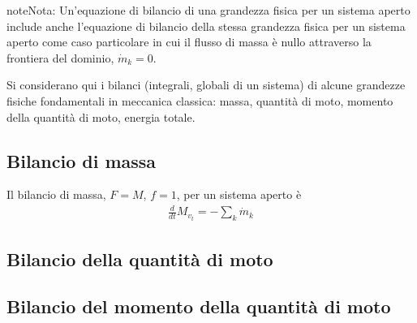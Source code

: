 \documentclass[letterpaper,10pt,italian]{jupyterBook}
\begin{document}
\begin{sphinxadmonition}{note}{Nota:}
\sphinxAtStartPar
Un’equazione di bilancio di una grandezza fisica per un sistema aperto include anche l’equazione di bilancio della stessa grandezza fisica per un sistema aperto come caso particolare in cui il flusso di massa è nullo attraverso la frontiera del dominio, \(\dot{m}_k = 0\).
\end{sphinxadmonition}

\sphinxAtStartPar
Si considerano qui i bilanci (integrali, globali di un sistema) di alcune grandezze fisiche fondamentali in meccanica classica: massa, quantità di moto, momento della quantità di moto, energia totale.


\subsection{Bilancio di massa}
\label{\detokenize{ch/thermodynamics/principles-open:bilancio-di-massa}}
\sphinxAtStartPar
Il bilancio di massa, \(F = M\), \(f = 1\), per un sistema aperto è
\begin{equation*}
\begin{split}\frac{d}{dt} M_{v_t} = - \sum_k \dot{m}_k\end{split}
\end{equation*}

\subsection{Bilancio della quantità di moto}
\label{\detokenize{ch/thermodynamics/principles-open:bilancio-della-quantita-di-moto}}
\sphinxAtStartPar
  


\subsection{Bilancio del momento della quantità di moto}
\label{\detokenize{ch/thermodynamics/principles-open:bilancio-del-momento-della-quantita-di-moto}}
\sphinxAtStartPar
  
\end{document}
